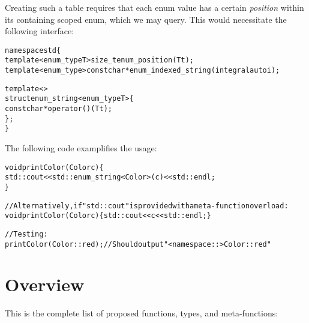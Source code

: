 \documentclass[a4paper, 12pt]{article}
\begin{document}
\noindent
Creating such a table requires that each enum value has a certain
\textit{position} within its containing scoped enum, which we may query.
This would necessitate the following interface:

\begin{alltt}\footnotesize
namespace std \{
  template<enum\_type T> size\_t enum\_position(T t);
  template<enum\_type> const char* enum\_indexed\_string(integral auto i);

  template<>
  struct enum\_string<enum\_type T> \{
    const char* operator()(T t);
  \};
\}
\end{alltt}

\noindent
The following code examplifies the usage:

\begin{alltt}\footnotesize
void printColor(Color c) \{
  std::cout << std::enum\_string<Color>(c) << std::endl;
\}

// Alternatively, if "std::cout" is provided with a meta-function overload:
void printColor(Color c) \{ std::cout << c << std::endl; \}

// Testing:
printColor(Color::red); // Should output "<namespace::>Color::red"
\end{alltt}



\newpage
\section{Overview}

This is the complete list of proposed functions, types, and meta-functions:
\end{document}
